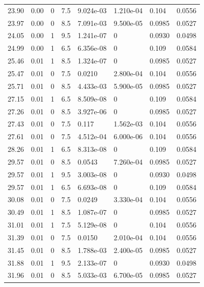 \documentclass[preview]{standalone}
\begin{document}
{{{\begin{tabular}{L{1.2cm}C{1.2cm} C{0.3cm}C{0.5cm} C{1.4cm}C{1.4cm} C{1.4cm}C{1.4cm}}
  23.90  &  0.00  & 0     & 7.5 &  9.024e-03  & 1.210e-04  & 0.104 &  0.0556   \\ 
  23.97  &  0.00  & 0     & 8.5 &  7.091e-03  & 9.500e-05  & 0.0985 &  0.0527   \\ 
  24.05  &  0.00  & 1     & 9.5 &  1.241e-07  & 0  & 0.0930 &  0.0498   \\ 
  24.99  &  0.00  & 1     & 6.5 &  6.356e-08  & 0  & 0.109 &  0.0584   \\ 
  25.46  &  0.01  & 1     & 8.5 &  1.324e-07  & 0  & 0.0985 &  0.0527   \\ 
  25.47  &  0.01  & 0     & 7.5 &  0.0210  & 2.800e-04  & 0.104 &  0.0556   \\ 
  25.71  &  0.01  & 0     & 8.5 &  4.433e-03  & 5.900e-05  & 0.0985 &  0.0527   \\ 
  27.15  &  0.01  & 1     & 6.5 &  8.509e-08  & 0  & 0.109 &  0.0584   \\ 
  27.26  &  0.01  & 0     & 8.5 &  3.927e-06  & 0  & 0.0985 &  0.0527   \\ 
  27.43  &  0.01  & 0     & 7.5 &  0.117  & 1.562e-03  & 0.104 &  0.0556   \\ 
  27.61  &  0.01  & 0     & 7.5 &  4.512e-04  & 6.000e-06  & 0.104 &  0.0556   \\ 
  28.26  &  0.01  & 1     & 6.5 &  8.313e-08  & 0  & 0.109 &  0.0584   \\ 
  29.57  &  0.01  & 0     & 8.5 &  0.0543  & 7.260e-04  & 0.0985 &  0.0527   \\ 
  29.57  &  0.01  & 1     & 9.5 &  3.003e-08  & 0  & 0.0930 &  0.0498   \\ 
  29.57  &  0.01  & 1     & 6.5 &  6.693e-08  & 0  & 0.109 &  0.0584   \\ 
  30.08  &  0.01  & 0     & 7.5 &  0.0249  & 3.330e-04  & 0.104 &  0.0556   \\ 
  30.49  &  0.01  & 1     & 8.5 &  1.087e-07  & 0  & 0.0985 &  0.0527   \\ 
  31.01  &  0.01  & 1     & 7.5 &  5.129e-08  & 0  & 0.104 &  0.0556   \\ 
  31.39  &  0.01  & 0     & 7.5 &  0.0150  & 2.010e-04  & 0.104 &  0.0556   \\ 
  31.45  &  0.01  & 0     & 8.5 &  1.788e-03  & 2.400e-05  & 0.0985 &  0.0527   \\ 
  31.88  &  0.01  & 1     & 9.5 &  2.133e-07  & 0  & 0.0930 &  0.0498   \\ 
  31.96  &  0.01  & 0     & 8.5 &  5.033e-03  & 6.700e-05  & 0.0985 &  0.0527   \\ 

\end{tabular}}}}
\end{document}
